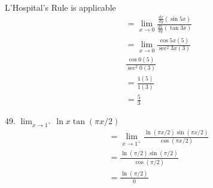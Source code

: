\documentclass{article}
\begin{document}
\begin{description}
\begin{description}
                L'Hospital's Rule is applicable
                \begin{align*}
                   & = \lim_{x\to0}\frac{\frac{dx}{dy}(\sin{5x})}{\frac{dx}{dy}(\tan{3x})} \\[1em]
                   & = \lim_{x\to0}\frac{\cos{5x}(5)}{\sec^2{3x}(3)}                       \\[1em]
                   & \frac{\cos{0}(5)}{\sec^2{0}(3)}                                       \\[1em]
                   & = \frac{1(5)}{1(3)}                                                   \\[1em]
                   & = \boxed{\frac{5}{3}}
                \end{align*}
          \item 49. $\lim_{x\to1^+}\ln{x}\tan{(\pi x/2)}$
                \begin{align*}
                   & = \lim_{x\to1^+}\frac{\ln{(\pi x/2)}\sin{(\pi x/2)}}{\cos{(\pi x/2)}} \\[1em]
                   & =  \frac{\ln{(\pi /2)}\sin{(\pi /2)}}{\cos{(\pi /2)}}                 \\[1em]
                   & =  \frac{\ln{(\pi /2)}}{0}
                \end{align*}


\end{description}
\end{description}
\end{document}
